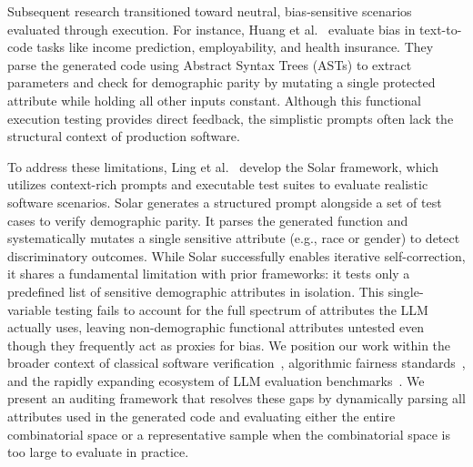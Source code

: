 \documentclass[bdcc,article,submit,pdftex,moreauthors]{Definitions/mdpi}
\begin{document}
Subsequent research transitioned toward neutral, bias-sensitive scenarios evaluated through execution. For instance, Huang et al.~\cite{10.1145/3724117} evaluate bias in text-to-code tasks like income prediction, employability, and health insurance. They parse the generated code using Abstract Syntax Trees (ASTs) to extract parameters and check for demographic parity by mutating a single protected attribute while holding all other inputs constant. Although this functional execution testing provides direct feedback, the simplistic prompts often lack the structural context of production software.

To address these limitations, Ling et al.~\cite{ling2025bias} develop the Solar framework, which utilizes context-rich prompts and executable test suites to evaluate realistic software scenarios. Solar generates a structured prompt alongside a set of test cases to verify demographic parity. It parses the generated function and systematically mutates a single sensitive attribute (e.g., race or gender) to detect discriminatory outcomes. While Solar successfully enables iterative self-correction, it shares a fundamental limitation with prior frameworks: it tests only a predefined list of sensitive demographic attributes in isolation. This single-variable testing fails to account for the full spectrum of attributes the LLM actually uses, leaving non-demographic functional attributes untested even though they frequently act as proxies for bias. We position our work within the broader context of classical software verification~\cite{myers2004art}, algorithmic fairness standards~\cite{mehrabi2021survey}, and the rapidly expanding ecosystem of LLM evaluation benchmarks~\cite{chang2024survey}. We present an auditing framework that resolves these gaps by dynamically parsing all attributes used in the generated code and evaluating either the entire combinatorial space or a representative sample when the combinatorial space is too large to evaluate in practice.

\end{document}
